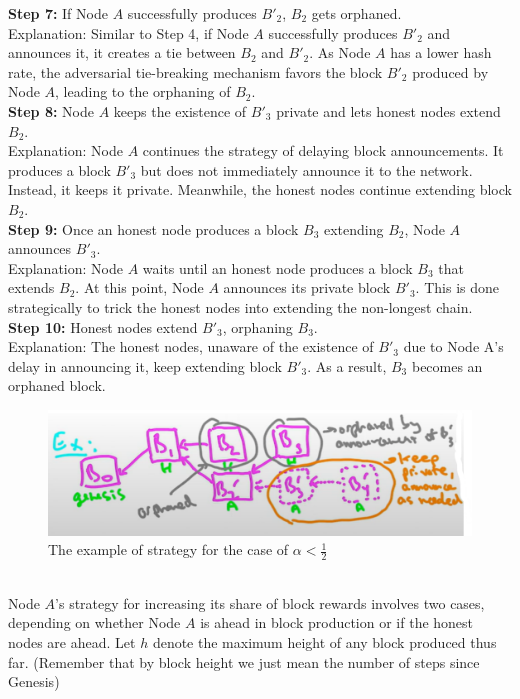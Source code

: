 \textbf{Step 7:} If Node $A$ successfully produces $B'_{2}$, $B_2$ gets orphaned.\\
Explanation: Similar to Step 4, if Node $A$ successfully produces $B'_2$ and announces it, it creates a tie between $B_2$ and $B'_2$. As Node $A$ has a lower hash rate, the adversarial tie-breaking mechanism favors the block $B'_2$ produced by Node $A$, leading to the orphaning of $B_2$.\\
\noindent
\textbf{Step 8:} Node $A$ keeps the existence of $B'_{3}$ private and lets honest nodes extend $B_2$.\\
Explanation: Node $A$ continues the strategy of delaying block announcements. It produces a block $B'_3$ but does not immediately announce it to the network. Instead, it keeps it private. Meanwhile, the honest nodes continue extending block $B_2$.\\
\noindent
\textbf{Step 9:} Once an honest node produces a block $B_3$ extending $B_2$, Node $A$ announces $B'_{3}$.\\
Explanation: Node $A$ waits until an honest node produces a block $B_3$ that extends $B_2$. At this point, Node $A$ announces its private block $B'_3$. This is done strategically to trick the honest nodes into extending the non-longest chain.\\
\noindent
\textbf{Step 10:} Honest nodes extend $B'_{3}$, orphaning $B_3$.\\
Explanation: The honest nodes, unaware of the existence of $B'_3$ due to Node A's delay in announcing it, keep extending block $B'_3$. As a result, $B_3$ becomes an orphaned block.\\
\begin{figure}[h]
    \centering
    \includegraphics[scale = 0.5]{figures/f42.png}
    \caption{The example of strategy for the case of $\alpha < \frac{1}{2}$}
    \label{fig:mesh1}
\end{figure}\\

Node $A$'s strategy for increasing its share of block rewards involves two cases, depending on whether Node $A$ is ahead in block production or if the honest nodes are ahead. Let $h$ denote the maximum height of any block produced thus far. (Remember that by block height we just mean the number of steps since Genesis)

